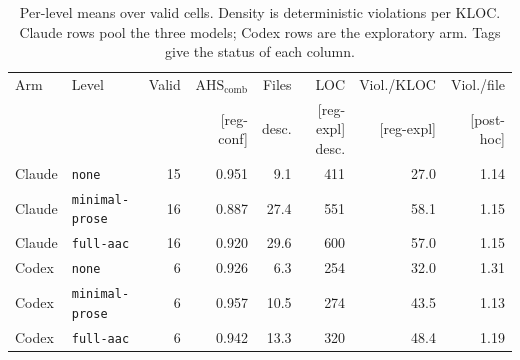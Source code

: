 \documentclass[10pt,a4paper]{article}
\newcommand{\regC}{\textsf{\scriptsize[reg-conf]}}  %
\newcommand{\regX}{\textsf{\scriptsize[reg-expl]}}  %
\newcommand{\ph}{\textsf{\scriptsize[post-hoc]}}    %
\newcommand{\lev}[1]{\texttt{\small #1}}
\newcommand{\AHSc}{\mathrm{AHS}_{\mathrm{comb}}}
\begin{document}
\begin{table}[t]
\centering\small
\caption{Per-level means over valid cells. Density is deterministic violations per KLOC. Claude rows pool the three
models; Codex rows are the exploratory arm. Tags give the status of each column.}
\label{tab:levels}
\begin{tabular}{@{}llrrrrrr@{}}
\toprule
Arm & Level & Valid & $\AHSc$ & Files & LOC & Viol./KLOC & Viol./file \\
 & & & \regC{} & desc. & \regX{} desc. & \regX{} & \ph{} \\
\midrule
Claude & \lev{none}          & 15 & 0.951 &  9.1 & 411 & 27.0 & 1.14 \\
Claude & \lev{minimal-prose} & 16 & 0.887 & 27.4 & 551 & 58.1 & 1.15 \\
Claude & \lev{full-aac}      & 16 & 0.920 & 29.6 & 600 & 57.0 & 1.15 \\
\midrule
Codex  & \lev{none}          &  6 & 0.926 &  6.3 & 254 & 32.0 & 1.31 \\
Codex  & \lev{minimal-prose} &  6 & 0.957 & 10.5 & 274 & 43.5 & 1.13 \\
Codex  & \lev{full-aac}      &  6 & 0.942 & 13.3 & 320 & 48.4 & 1.19 \\
\bottomrule
\end{tabular}
\end{table}
\end{document}
